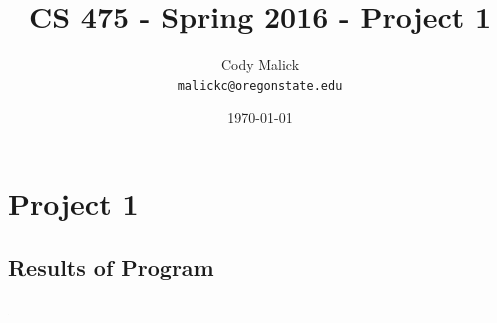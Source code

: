 \documentclass[10pt,letterpaper]{article}
\begin{document}
\begin{titlepage}
  \title{CS 475 - Spring 2016 - Project 1}
  \author{Cody Malick\\
  \texttt{malickc@oregonstate.edu}}
  \date{\today}
  \maketitle
  \vspace*{2cm}

\end{titlepage}

\section{Project 1}
	\subsection{Results of Program}
  \includegraphics[height=1, width=1,natwidth=689,natheight=966]{LogScale.png}
	\subsubsection{}

	\subsubsection{}

	\subsubsection{}

	\subsubsection{}
\end{document}
